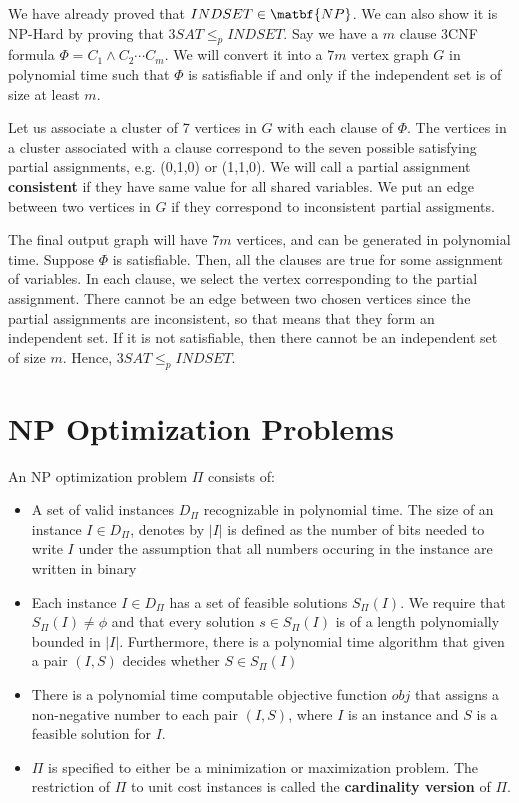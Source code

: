 \documentclass[12pt,letterpaper]{article}
\theoremstyle{definition}
\begin{document}
We have already proved that $INDSET \in \matbf{NP}$. We can also show it is NP-Hard by proving that $3SAT \leq_p INDSET$. Say we have a $m$ clause 3CNF formula $\Phi = C_1 \land C_2 \cdots C_m$. We will convert it into a $7m$ vertex graph $G$ in polynomial time such that $\Phi$ is satisfiable if and only if the independent set is of size at least $m$.

Let us associate a cluster of 7 vertices in $G$ with each clause of $\Phi$. The vertices in a cluster associated with a clause correspond to the seven possible satisfying partial assignments, e.g. (0,1,0) or (1,1,0). We will call a partial assignment \textbf{consistent} if they have same value for all shared variables.  We put an edge between two vertices in $G$ if they correspond to inconsistent partial assigments.

The final output graph will have $7m$ vertices, and can be generated in polynomial time. Suppose $\Phi$ is satisfiable. Then, all the clauses are true for some assignment of variables. In each clause, we select the vertex corresponding to the partial assignment. There cannot be an edge between two chosen vertices since the partial assignments are inconsistent, so that means that they form an independent set. If it is not satisfiable, then there cannot be an independent set of size $m$. Hence, $3SAT \leq_p INDSET$.

\section{NP Optimization Problems}

An NP optimization problem $\Pi$ consists of:

\begin{itemize}
  \item A set of valid instances $D_\Pi$ recognizable in polynomial time. The size of an instance $I \in D_\Pi$, denotes by $|I|$ is defined as the number of bits needed to write $I$ under the assumption that all numbers occuring in the instance are written in binary
  \item Each instance $I \in D_\Pi$ has a set of feasible solutions $S_\Pi (I)$. We require that $S_\Pi(I) \neq \phi$  and that every solution $s \in S_\Pi(I)$ is of a length polynomially bounded in $|I|$.  Furthermore, there is a polynomial time algorithm that given a pair $(I,S)$ decides whether $S \in S_\Pi(I)$
  \item There is a polynomial time computable objective function $obj$ that assigns a non-negative number to each pair $(I,S)$, where $I$ is an instance and $S$ is a feasible solution for $I$.
  \item $\Pi$ is specified to either be a minimization or maximization problem. The restriction of $\Pi$ to unit cost instances is called the \textbf{cardinality version} of $\Pi$.
\end{itemize}
\end{document}
